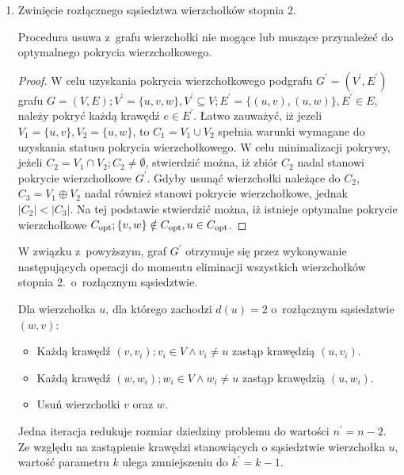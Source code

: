 \begin{enumerate}
  \item Zwinięcie rozłącznego sąsiedztwa wierzchołków stopnia 2.
    \begin{theorem}
      Procedura usuwa z~grafu wierzchołki nie mogące lub muszące przynależeć do 
      optymalnego pokrycia wierzchołkowego.
    \end{theorem}
    \begin{proof}
      W celu uzyskania pokrycia wierzchołkowego podgrafu $G^\prime=(V^\prime,E^\prime)$
      grafu ${G=(V,E); V^\prime=\{u, v, w\}, V^\prime \subseteq V; E^\prime=\{(u,v),
      (u,w)\}, E^\prime \in E}$,
      należy pokryć każdą krawędź $e \in E^\prime$. 
      Łatwo zauważyć, iż jezeli $V_1=\{u,v\}, V_2=\{u,w\}$, 
      to $C_1=V_1 \cup V_2$ spełnia warunki wymagane do uzyskania statusu
      pokrycia wierzchołkowego.
      W celu minimalizacji pokrywy, jeżeli $C_2=V_1 \cap V_2; C_2 \neq \emptyset$,
      stwierdzić można, iż zbiór $C_2$ nadal stanowi pokrycie wierzchołkowe $G^\prime$.
      Gdyby usunąć wierzchołki należące do $C_2$, $C_3=V_1 \oplus V_2$ nadal
      również stanowi pokrycie wierzchołkowe, jednak $|C_2| < |C_3|$.
      Na tej podstawie stwierdzić można, iż istnieje optymalne pokrycie wierzchołkowe $C_{\textnormal{opt}}; \{v,w\} \notin C_{\textnormal{opt}}, u \in C_{\textnormal{opt}}$.
    \end{proof}

    W związku z~powyższym, graf $G^\prime$ otrzymuje się przez wykonywanie
    następujących operacji do momentu eliminacji wszystkich wierzchołków stopnia
    2.\ o~rozłącznym sąsiedztwie.

    Dla wierzchołka $u$, dla którego zachodzi $d(u)=2$ o~rozłącznym sąsiedztwie $(w,v)$:
    \begin{itemize}
      \item Każdą krawędź $(v,v_i); v_i \in V \land v_i \neq u$ zastąp 
        krawędzią $(u, v_i)$.
      \item Każdą krawędź $(w,w_i); w_i \in V \land w_i \neq u$ zastąp
        krawędzią $(u, w_i)$.
      \item Usuń wierzchołki $v$ oraz $w$.
    \end{itemize}
    Jedna iteracja redukuje rozmiar dziedziny problemu do wartości
    $n^\prime=n-2$.
    Ze względu na zastąpienie krawędzi stanowiących o sąsiedztwie wierzchołka $u$,
    wartość parametru $k$ ulega zmniejszeniu do $k^\prime=k-1$.

\end{enumerate}

